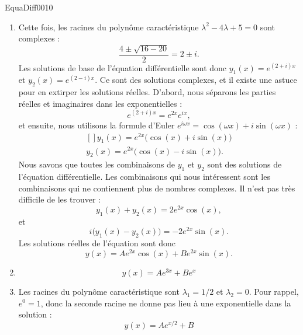 \begin{corrige}{EquaDiff0010}
\begin{enumerate}
\item
	Cette fois, les racines du polynôme caractéristique $\lambda^2-4\lambda+5=0$ sont complexes :
	\begin{equation}
		\frac{ 4\pm\sqrt{16-20} }{ 2 }=2\pm i.
	\end{equation}
	Les solutions de base de l'équation différentielle sont donc $y_1(x)= e^{(2+i)x}$ et $y_2(x)= e^{(2-i)x}$. Ce sont des solutions complexes, et il existe une astuce pour en extirper les solutions réelles. D'abord, nous séparons les parties réelles et imaginaires dans les exponentielles :
	\begin{equation}
		e^{(2+i)x}= e^{2x} e^{ix},
	\end{equation}
	et ensuite, nous utilisons la formule d'Euler $ e^{i\omega x}=\cos(\omega x)+i\sin(\omega x)$ :
	\begin{equation}
		\begin{aligned}[]
			y_1(x)= e^{2x}\big( \cos(x)+i\sin(x) \big)\\
			y_2(x)= e^{2x}\big( \cos(x)-i\sin(x) \big).
		\end{aligned}
	\end{equation}
	Nous savons que toutes les combinaisons de $y_1$ et $y_2$ sont des solutions de l'équation différentielle. Les combinaisons qui nous intéressent sont les combinaisons qui ne contiennent plus de nombres complexes. Il n'est pas très difficile de les trouver :
	\begin{equation}
		y_1(x)+y_2(x)=2 e^{2x}\cos(x),
	\end{equation}
	et
	\begin{equation}
		i\big( y_1(x)-y_2(x) \big)=-2 e^{2x}\sin(x).
	\end{equation}
	Les solutions réelles de l'équation sont donc 
	\begin{equation}
		y(x)=A e^{2x}\cos(x)+B e^{2x}\sin(x).
	\end{equation}
			

\item
	\begin{equation}
		y(x)=A e^{3x}+B e^{x}
	\end{equation}

\item
	Les racines du polynôme caractéristique sont $\lambda_1=1/2$ et $\lambda_2=0$. Pour rappel, $e^0=1$, donc la seconde racine ne donne pas lieu à une exponentielle dans la solution :
	\begin{equation}
		y(x)=A e^{x/2}+B
	\end{equation}


\end{enumerate}
\end{corrige}
